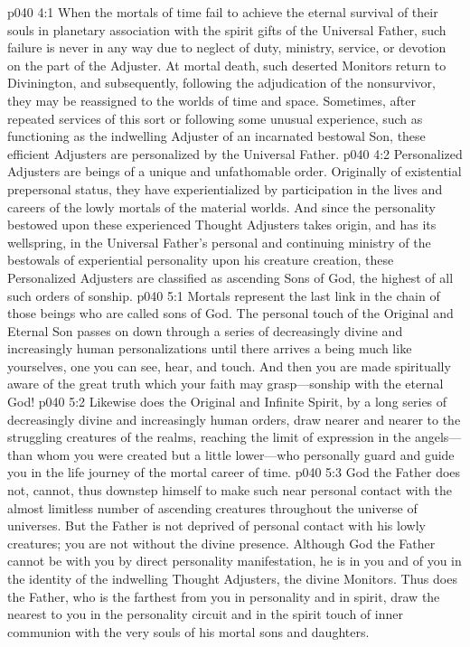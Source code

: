 \vs p040 4:1 When the mortals of time fail to achieve the eternal survival of their souls in planetary association with the spirit gifts of the Universal Father, such failure is never in any way due to neglect of duty, ministry, service, or devotion on the part of the Adjuster. At mortal death, such deserted Monitors return to Divinington, and subsequently, following the adjudication of the nonsurvivor, they may be reassigned to the worlds of time and space. Sometimes, after repeated services of this sort or following some unusual experience, such as functioning as the indwelling Adjuster of an incarnated bestowal Son, these efficient Adjusters are personalized by the Universal Father.
\vs p040 4:2 Personalized Adjusters are beings of a unique and unfathomable order. Originally of existential prepersonal status, they have experientialized by participation in the lives and careers of the lowly mortals of the material worlds. And since the personality bestowed upon these experienced Thought Adjusters takes origin, and has its wellspring, in the Universal Father’s personal and continuing ministry of the bestowals of experiential personality upon his creature creation, these Personalized Adjusters are classified as ascending Sons of God, the highest of all such orders of sonship.
\vs p040 5:1 Mortals represent the last link in the chain of those beings who are called sons of God. The personal touch of the Original and Eternal Son passes on down through a series of decreasingly divine and increasingly human personalizations until there arrives a being much like yourselves, one you can see, hear, and touch. And then you are made spiritually aware of the great truth which your faith may grasp---sonship with the eternal God!
\vs p040 5:2 Likewise does the Original and Infinite Spirit, by a long series of decreasingly divine and increasingly human orders, draw nearer and nearer to the struggling creatures of the realms, reaching the limit of expression in the angels---than whom you were created but a little lower---who personally guard and guide you in the life journey of the mortal career of time.
\vs p040 5:3 God the Father does not, cannot, thus downstep himself to make such near personal contact with the almost limitless number of ascending creatures throughout the universe of universes. But the Father is not deprived of personal contact with his lowly creatures; you are not without the divine presence. Although God the Father cannot be with you by direct personality manifestation, he is in you and of you in the identity of the indwelling Thought Adjusters, the divine Monitors. Thus does the Father, who is the farthest from you in personality and in spirit, draw the nearest to you in the personality circuit and in the spirit touch of inner communion with the very souls of his mortal sons and daughters.

